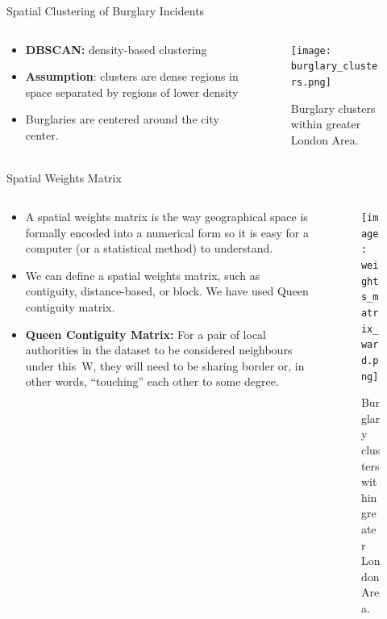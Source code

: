 \documentclass[10pt, aspectratio=169]{beamer}
\begin{document}
\begin{frame}{Spatial Clustering of Burglary Incidents}
    \begin{columns}
        \begin{column}{0.5\textwidth}
            \begin{itemize}
                \item \textbf{DBSCAN:} density-based clustering
                \item \textbf{Assumption}: clusters are dense regions in space separated by regions of lower density
                \item Burglaries are centered around the city center.
            \end{itemize}
        \end{column}
        \begin{column}{0.5\textwidth}
            \begin{figure}
            \centering
                \texttt{[image: burglary\_clusters.png]}
                \caption{Burglary clusters within greater London Area.}
            \end{figure}
        \end{column}
    \end{columns}
\end{frame}

\begin{frame}{Spatial Weights Matrix}
    \begin{columns}
        \begin{column}{0.5\textwidth}
            \begin{itemize}
                \item A spatial weights matrix is the way geographical space is formally encoded into
                a numerical form so it is easy for a computer (or a statistical method) to understand.
                \item We can define a spatial weights matrix, such as contiguity, distance-based,
                or block. We have used Queen contiguity matrix.
                \item \textbf{Queen Contiguity Matrix:} For a pair of local authorities in the dataset to be
                considered neighbours under this W, they will need to be sharing border or, in other words, “touching” each other to some degree.

            \end{itemize}
        \end{column}
        \begin{column}{0.5\textwidth}
            \begin{figure}
            \centering
                \texttt{[image: weights\_matrix\_ward.png]}
                \caption{Burglary clusters within greater London Area.}
            \end{figure}
        \end{column}
    \end{columns}
\end{frame}
\end{document}
